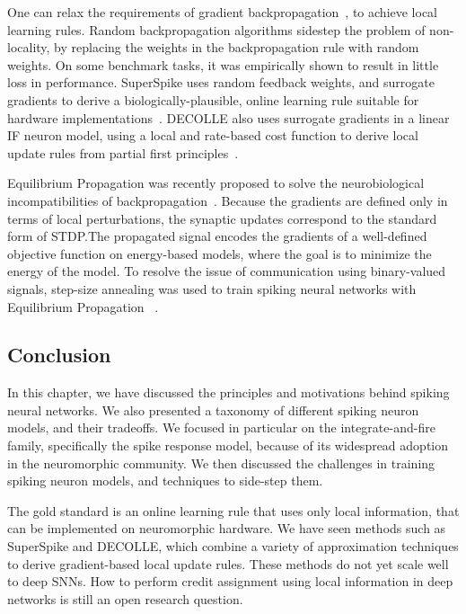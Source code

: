 \documentclass[fyp]{socreport}
\begin{document}
One can relax the requirements of gradient
backpropagation~\cite{neftci19_surrog_gradien_learn_spikin_neural_networ}, to
achieve local learning rules. Random backpropagation algorithms sidestep the
problem of non-locality, by replacing the weights in the backpropagation rule
with random weights. On some benchmark tasks, it was empirically shown to result
in little loss in performance. SuperSpike uses random feedback weights, and
surrogate gradients to derive a biologically-plausible, online learning rule
suitable for hardware implementations~\cite{zenke17_super}. DECOLLE also uses
surrogate gradients in a linear IF neuron model, using a local and rate-based
cost function to derive local update rules from partial first
principles~\cite{kaiser18_synap_plast_dynam_deep_contin}.

Equilibrium Propagation was recently proposed to solve the neurobiological
incompatibilities of backpropagation~\cite{10.3389/fncom.2017.00024}. Because
the gradients are defined only in terms of local perturbations, the synaptic
updates correspond to the standard form of STDP.\@ The propagated signal encodes
the gradients of a well-defined objective function on energy-based models, where
the goal is to minimize the energy of the model. To resolve the issue of
communication using binary-valued signals, step-size annealing was used to train
spiking neural networks with Equilibrium Propagation
~\cite{pmlr-v89-o-connor19a}.

\subsection{Conclusion\label{sec:background_conclusion}}

In this chapter, we have discussed the principles and motivations behind spiking
neural networks. We also presented a taxonomy of different spiking neuron
models, and their tradeoffs. We focused in particular on the integrate-and-fire
family, specifically the spike response model, because of its widespread
adoption in the neuromorphic community. We then discussed the challenges in
training spiking neuron models, and techniques to side-step them.

The gold standard is an online learning rule that uses only local information,
that can be implemented on neuromorphic hardware. We have seen methods such as
SuperSpike and DECOLLE, which combine a variety of approximation techniques to
derive gradient-based local update rules. These methods do not yet scale well to
deep SNNs. How to perform credit assignment using local information in deep
networks is still an open research question.
\end{document}
